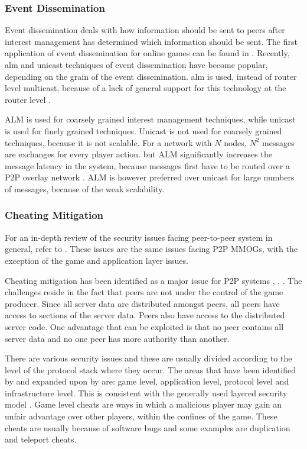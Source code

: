 \documentclass[journal,oneside,a4paper,onecolumn]{IEEEtran}
\begin{document}
\subsubsection{Event Dissemination}
Event dissemination deals with how information should be sent to peers after interest management has determined which information should be sent. The first application of event dissemination for online games can be found in \cite{first_GED}. Recently, \ac{alm} and unicast techniques of event dissemination have become popular, depending on the grain of the event dissemination. \ac{alm} is used, instead of router level multicast, because of a lack of general support for this technology at the router level \cite{ip_multicast_deployment_issues}.

ALM is used for coarsely grained interest management techniques, while unicast is used for finely grained techniques. Unicast is not used for coarsely grained techniques, because it is not scalable. For a network with $N$ nodes, $N^2$ messages are exchanges for every player action. but ALM significantly increases the message latency in the system, because messages first have to be routed over a P2P overlay network \cite{}. ALM is however preferred over unicast for large numbers of messages, because of the weak scalability.

\subsubsection{Cheating Mitigation}


For an in-depth review of the security issues facing peer-to-peer system in general, refer to \cite{p2p_security_issues}. These issues are the same issues facing P2P MMOGs, with the exception of the game and application layer issues. %

Cheating mitigation has been identified as a major issue for P2P systems \cite{knutsson_p2p_first}, \cite{challenges_p2p_gaming}, \cite{cheat_proof_event_ordering}. The challenges reside in the fact that peers are not under the control of the game producer. Since all server data are distributed amongst peers, all peers have access to sections of the server data. Peers also have access to the distributed server code. One advantage that can be exploited is that no peer contains all server data and no one peer has more authority than another.

There are various security issues and these are usually divided according to the level of the protocol stack where they occur. The areas that have been identified by \cite{cheat_proof_event_ordering} and expanded upon by \cite{cheating_taxonomy} are: game level, application level, protocol level and infrastructure level. This is consistent with the generally used layered security model \cite{distributed_systems_security}. Game level cheats are ways in which a malicious player may gain an unfair advantage over other players, within the confines of the game. These cheats are usually because of software bugs and some examples are duplication and teleport cheats.
\end{document}
